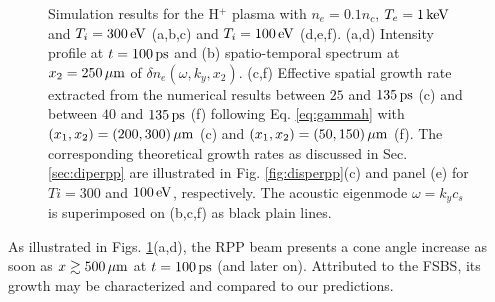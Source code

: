 \documentclass[
 reprint,
 superscriptaddress,
 amsmath,amssymb,
 aps,
]{revtex4-1}
\begin{document}
\begin{figure}
\begin{tabular}{ccc}
\end{tabular}
\caption{ \label{fig:comphydro}  Simulation results for the H$^+$ plasma with $n_e=0.1n_c$, $T_e=1\,\rm keV$ and $T_i=300\,\rm eV$ (a,b,c) and $T_i=100\,\rm eV$ (d,e,f).
(a,d) Intensity profile at $t=100\,\rm ps$ and (b) spatio-temporal spectrum at $x_2=250\,\rm\mu m$ of $\delta n_e(\omega,k_y,x_2)$. 
(c,f) Effective spatial growth rate extracted from the numerical results between $25$ and $135\,\rm ps$ (c) and between  $40$ and $135\,\rm ps$ (f) following Eq. \eqref{eq:gammah} with $(x_1,x_2)=(200,300)\, \rm \mu m$ (c) and $(x_1,x_2)=(50,150)\, \rm \mu m$ (f).
The corresponding theoretical  growth rates as discussed in Sec. \ref{sec:diperpp} are illustrated in Fig. \ref{fig:disperpp}(c) and panel (e) for $Ti=300$ and  $100\, \rm eV$, respectively.
The acoustic eigenmode $\omega=k_yc_s$ is superimposed on (b,c,f) as black plain lines.
}
\end{figure}
As illustrated in Figs. \ref{fig:comphydro}(a,d),  the RPP beam presents a cone angle increase as soon as $x\gtrsim 500\,\rm\mu m$ at $t=100\,\rm ps$ (and later on). Attributed to the FSBS, its growth may be characterized and compared to our predictions. 
\end{document}
